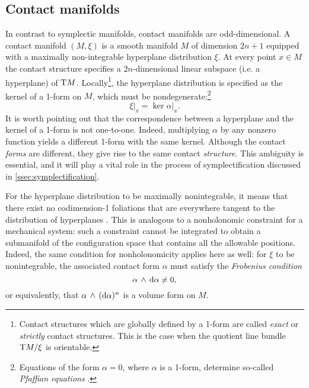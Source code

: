 \subsection{Contact manifolds}
\label{ssec:contact_manifolds}
In contrast to symplectic manifolds, contact manifolds are odd-dimensional. A contact manifold \((M, \xi)\) is a smooth manifold \(M\) of dimension \(2n + 1\) equipped with a maximally non-integrable hyperplane distribution \(\xi\). At every point \(x \in M\) the contact structure specifies a \(2n\)-dimensional linear subspace (i.e. a hyperplane) of \(\mathrm{T}M\). Locally\footnote
{
    Contact structures which are globally defined by a 1-form are called \emph{exact} or \emph{strictly} contact structures. This is the case when the quotient line bundle \( \mathrm{T}M/\xi\) is orientable. 
}, the hyperplane distribution is specified as the kernel of a 1-form on \(M\), which must be nondegenerate:\footnote{Equations of the form \( \alpha = 0\), where \(\alpha\) is a 1-form, determine so-called \emph{Pfaffian equations} \cite{Libermann1987}.} \cite{Geiges2008, Arnold1989, Cannas2001}
\begin{equation}
     \xi\vert_x = \ker{\alpha}\vert_x.
\end{equation}
It is worth pointing out that the correspondence between a hyperplane and the kernel of a 1-form is not one-to-one. Indeed, multiplying \(\alpha\) by any nonzero function yields a different 1-form with the same kernel. Although the contact \emph{forms} are different, they give rise to the same contact \emph{structure}. This ambiguity is essential, and it will play a vital role in the process of symplectification discussed in \cref{ssec:symplectification}.

For the hyperplane distribution to be maximally nonintegrable, it means that there exist no codimension-1 foliations that are everywhere tangent to the distribution of hyperplanes \cite{Geiges2008}. This is analogous to a nonholonomic constraint for a mechanical system: such a constraint cannot be integrated to obtain a submanifold of the configuration space that contains all the allowable positions. Indeed, the same condition for nonholonomicity applies here as well: for \(\xi\) to be nonintegrable, the associated contact form \(\alpha\) must satisfy the \emph{Frobenius condition}
\begin{equation}
      \alpha\,\wedge\,\dd{\alpha}  \neq 0,
\end{equation}
or equivalently, that \( \alpha\,\wedge\,(\dd{\alpha})^n \) is a volume form on \(M\). 

